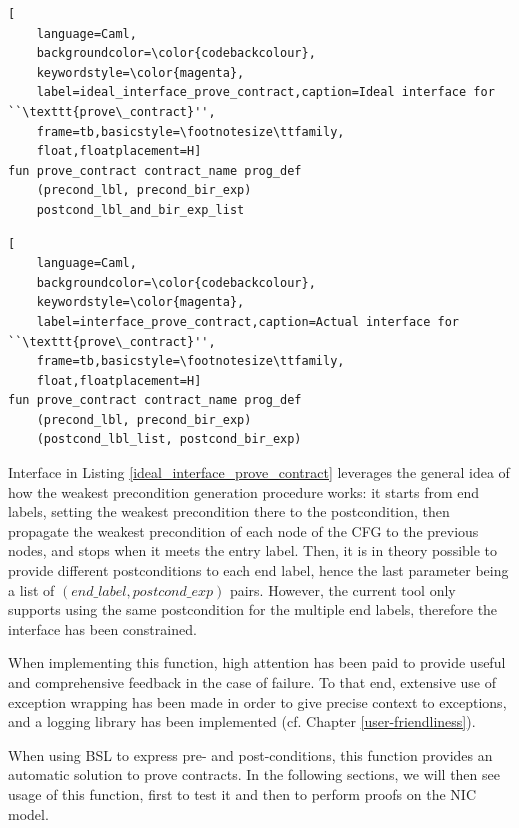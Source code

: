 \documentclass{kththesis}
\begin{document}
{\begin{lstlisting}[
    language=Caml,
    backgroundcolor=\color{codebackcolour},
    keywordstyle=\color{magenta},
    label=ideal_interface_prove_contract,caption=Ideal interface for ``\texttt{prove\_contract}'',
    frame=tb,basicstyle=\footnotesize\ttfamily,
    float,floatplacement=H]
fun prove_contract contract_name prog_def
    (precond_lbl, precond_bir_exp)
    postcond_lbl_and_bir_exp_list
\end{lstlisting}

\begin{lstlisting}[
    language=Caml,
    backgroundcolor=\color{codebackcolour},
    keywordstyle=\color{magenta},
    label=interface_prove_contract,caption=Actual interface for ``\texttt{prove\_contract}'',
    frame=tb,basicstyle=\footnotesize\ttfamily,
    float,floatplacement=H]
fun prove_contract contract_name prog_def
    (precond_lbl, precond_bir_exp)
    (postcond_lbl_list, postcond_bir_exp)
\end{lstlisting}

Interface in Listing \ref{ideal_interface_prove_contract} leverages the general idea of how the weakest precondition generation procedure works: it starts from end labels, setting the weakest precondition there to the postcondition, then propagate the weakest precondition of each node of the \gls{CFG} to the previous nodes, and stops when it meets the entry label. Then, it is in theory possible to provide different postconditions to each end label, hence the last parameter being a list of $(end\_label, postcond\_exp)$ pairs. However, the current tool only supports using the same postcondition for the multiple end labels, therefore the interface has been constrained\footnotemark.


When implementing this function, high attention has been paid to provide useful and comprehensive feedback in the case of failure. To that end, extensive use of exception wrapping has been made in order to give precise context to exceptions, and a logging library has been implemented (cf. Chapter \ref{user-friendliness}).

When using \gls{BSL} to express pre- and post-conditions, this function provides an automatic solution to prove contracts. In the following sections, we will then see usage of this function, first to test it and then to perform proofs on the NIC model.

}
\end{document}
